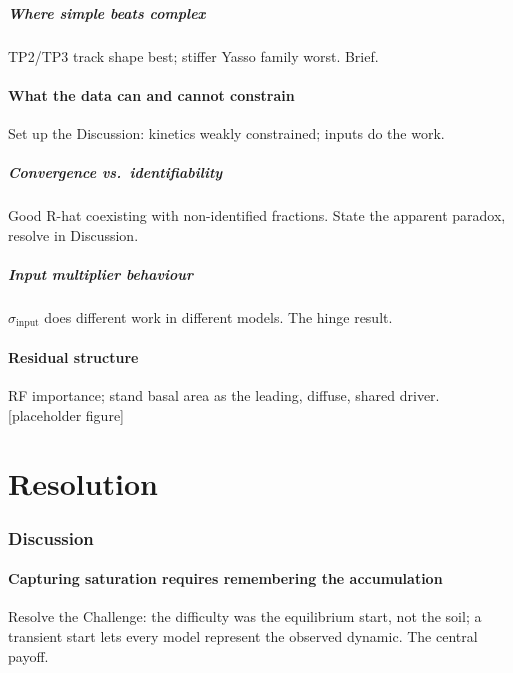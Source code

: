 \documentclass[11pt]{article}
\begin{document}
\subsubsection{Where simple beats complex}
TP2/TP3 track shape best; stiffer Yasso family worst. Brief.

\subsection{What the data can and cannot constrain}
Set up the Discussion: kinetics weakly constrained; inputs do the work.

\subsubsection{Convergence vs.\ identifiability}
Good R-hat coexisting with non-identified fractions. State the apparent
paradox, resolve in Discussion.

\subsubsection{Input multiplier behaviour}
$\sigma_{\mathrm{input}}$ does different work in different models. The hinge
result.

\subsection{Residual structure}
RF importance; stand basal area as the leading, diffuse, shared driver.
[placeholder figure]

\part{Resolution}

\section{Discussion}

\subsection{Capturing saturation requires remembering the accumulation}
Resolve the Challenge: the difficulty was the equilibrium start, not the soil;
a transient start lets every model represent the observed dynamic. The central
payoff.
\end{document}
